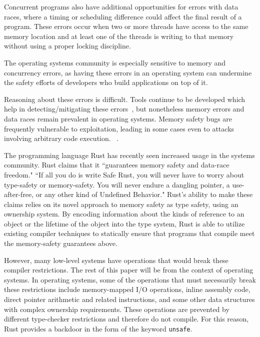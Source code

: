 \documentclass[12pt]{article}
\begin{document}
Concurrent programs also have additional opportunities for errors with data races, where a timing or scheduling difference could affect the final result of a program. These errors occur when two or more threads have access to the same memory location and at least one of the threads is writing to that memory without using a proper locking discipline\cite{placeholder}. 

The operating systems community is especially sensitive to memory and concurrency errors, as having these errors in an operating system can undermine the safety efforts of developers who build applications on top of it.

Reasoning about these errors is difficult. Tools continue to be developed which help in detecting/mitigating these errors~\cite{osmemorysafety, redflag}, but nonetheless memory errors and data races remain prevalent in operating systems. Memory safety bugs are frequently vulnerable to exploitation, leading in some cases even to attacks involving arbitrary code execution. ~\cite{android_vulnerabilities, placeholder}. %

The programming language Rust has recently seen increased usage in the systems community. Rust claims that it ``guarantees memory safety and data-race freedom."\cite{rust_style} 
``If all you do is write Safe Rust, you will never have to worry about type-safety or memory-safety. You will never endure a dangling pointer, a use-after-free, or any other kind of Undefined Behavior."\cite{rust_nomicon}
Rust's ability to make these claims relies on its novel approach to memory safety as type safety, using an ownership system. By encoding information about the kinds of reference to an object or the lifetime of the object into the type system, Rust is able to utilize existing compiler techniques to statically ensure that programs that compile meet the memory-safety guarantees above.

However, many low-level systems have operations that would break these compiler restrictions. The rest of this paper will be from the context of operating systems. In operating systems, some of the operations that must necessarily break these restrictions include memory-mapped I/O operations, inline assembly code, direct pointer arithmetic and related instructions, and some other data structures with complex ownership requirements. These operations are prevented by different type-checker restrictions and therefore do not compile. For this reason, Rust provides a backdoor in the form of the keyword \texttt{unsafe}.
\end{document}
